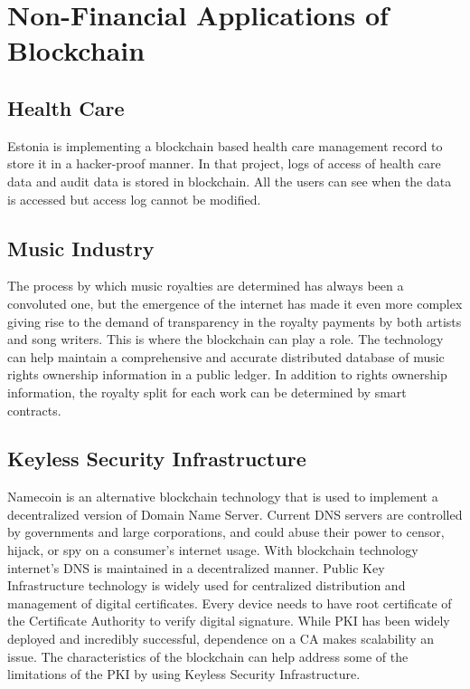 \section{Non-Financial Applications of Blockchain}
\subsection{Health Care}
Estonia is implementing a blockchain based health care management record to store it in a hacker-proof manner. In that project, logs of access of health care data and audit data is stored in blockchain. All the users can see when the data is accessed but access log cannot be modified.

\subsection{Music Industry}
The process by which music royalties are determined has always been a convoluted one, but the emergence of the internet has made it even more complex giving rise to the demand of transparency in the royalty payments by both artists and song writers. This is where the blockchain can play a role. The technology can help maintain a comprehensive and accurate distributed database of music rights ownership information in a public ledger. In addition to rights ownership information, the royalty split for each work can be determined by smart contracts.

\subsection{Keyless Security Infrastructure}
Namecoin is an alternative blockchain technology that is used to implement a decentralized version of Domain Name Server. Current DNS servers are controlled by governments and large corporations, and could abuse their power to censor, hijack, or spy on a consumer’s internet usage. With blockchain technology internet’s DNS is maintained in a decentralized manner. Public Key Infrastructure technology is widely used for centralized distribution and management of digital certificates. Every device needs to have root certificate of the Certificate Authority to verify digital signature. While PKI has been widely deployed and incredibly successful, dependence on a CA makes scalability an issue. The characteristics of the blockchain can help address some of the limitations of the PKI by using Keyless Security Infrastructure.

